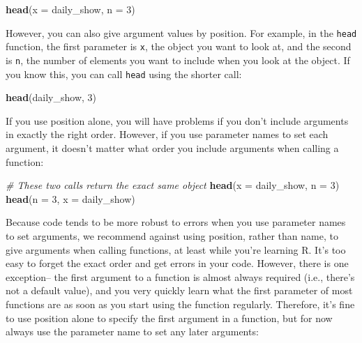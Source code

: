\documentclass[]{book}
\makeatletter
\newenvironment{Shaded}{\begin{snugshade}}{\end{snugshade}}
\newcommand{\KeywordTok}[1]{\textcolor[rgb]{0.13,0.29,0.53}{\textbf{{#1}}}}
\newcommand{\DataTypeTok}[1]{\textcolor[rgb]{0.13,0.29,0.53}{{#1}}}
\newcommand{\DecValTok}[1]{\textcolor[rgb]{0.00,0.00,0.81}{{#1}}}
\newcommand{\CommentTok}[1]{\textcolor[rgb]{0.56,0.35,0.01}{\textit{{#1}}}}
\newcommand{\NormalTok}[1]{{#1}}
\newenvironment{kframe}{%
\medskip{}
\setlength{\fboxsep}{.8em}
 \def\at@end@of@kframe{}%
 \ifinner\ifhmode%
  \def\at@end@of@kframe{\end{minipage}}%
  \begin{minipage}{\columnwidth}%
 \fi\fi%
 \def\FrameCommand##1{\hskip\@totalleftmargin \hskip-\fboxsep
 \colorbox{shadecolor}{##1}\hskip-\fboxsep
     \hskip-\linewidth \hskip-\@totalleftmargin \hskip\columnwidth}%
 \MakeFramed {\advance\hsize-\width
   \@totalleftmargin\z@ \linewidth\hsize
   \@setminipage}}%
 {\par\unskip\endMakeFramed%
 \at@end@of@kframe}
\renewenvironment{Shaded}{\begin{kframe}}{\end{kframe}}
\makeatother
\begin{document}
\begin{Shaded}
\begin{Highlighting}[]
\KeywordTok{head}\NormalTok{(}\DataTypeTok{x =} \NormalTok{daily_show, }\DataTypeTok{n =} \DecValTok{3}\NormalTok{)}
\end{Highlighting}
\end{Shaded}

However, you can also give argument values by position. For example, in
the \texttt{head} function, the first parameter is \texttt{x}, the
object you want to look at, and the second is \texttt{n}, the number of
elements you want to include when you look at the object. If you know
this, you can call \texttt{head} using the shorter call:

\begin{Shaded}
\begin{Highlighting}[]
\KeywordTok{head}\NormalTok{(daily_show, }\DecValTok{3}\NormalTok{)}
\end{Highlighting}
\end{Shaded}

If you use position alone, you will have problems if you don't include
arguments in exactly the right order. However, if you use parameter
names to set each argument, it doesn't matter what order you include
arguments when calling a function:

\begin{Shaded}
\begin{Highlighting}[]
\CommentTok{# These two calls return the exact same object}
\KeywordTok{head}\NormalTok{(}\DataTypeTok{x =} \NormalTok{daily_show, }\DataTypeTok{n =} \DecValTok{3}\NormalTok{)}
\KeywordTok{head}\NormalTok{(}\DataTypeTok{n =} \DecValTok{3}\NormalTok{, }\DataTypeTok{x =} \NormalTok{daily_show)}
\end{Highlighting}
\end{Shaded}

Because code tends to be more robust to errors when you use parameter
names to set arguments, we recommend against using position, rather than
name, to give arguments when calling functions, at least while you're
learning R. It's too easy to forget the exact order and get errors in
your code. However, there is one exception-- the first argument to a
function is almost always required (i.e., there's not a default value),
and you very quickly learn what the first parameter of most functions
are as soon as you start using the function regularly. Therefore, it's
fine to use position alone to specify the first argument in a function,
but for now always use the parameter name to set any later arguments:
\end{document}
